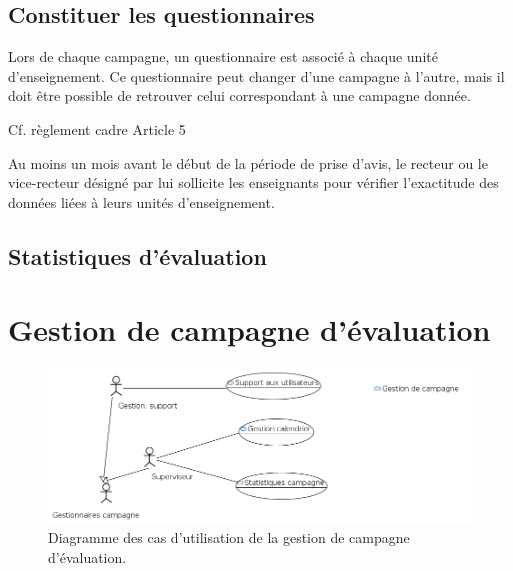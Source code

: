 \documentclass[a4paper,11pt]{report}
\begin{document}
\subsection{Constituer les questionnaires}\label{sec:constituer-quest}
Lors de chaque campagne, un questionnaire est associé à chaque unité d'enseignement.
Ce questionnaire peut changer d'une campagne à l'autre, mais il doit être possible de retrouver celui correspondant à une campagne donnée.

Cf. règlement cadre Article 5

Au moins un mois avant le début de la période de prise d'avis, le recteur ou le vice-recteur désigné par lui sollicite les enseignants pour vérifier l'exactitude des données liées à leurs unités d'enseignement.






\subsection{Statistiques d'évaluation}


















\newpage
\section{Gestion de campagne d'évaluation}

\begin{figure}[ht]
\includegraphics[width=\linewidth]{workspace/evalens-usecases/gestion_campagne.png}
\caption{Diagramme des cas d'utilisation de la gestion de campagne d'évaluation.}
\label{fig:usecase-campagne}
\end{figure}
\end{document}
